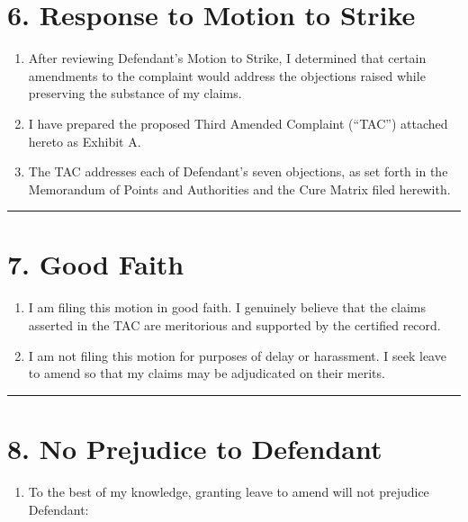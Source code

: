 \section{6. Response to Motion to Strike}\label{response-to-motion-to-strike}

\begin{enumerate}
\def\labelenumi{\arabic{enumi}.}
\setcounter{enumi}{12}
\item
  After reviewing Defendant's Motion to Strike, I determined that certain amendments to the complaint would address the objections raised while preserving the substance of my claims.
\item
  I have prepared the proposed Third Amended Complaint (``TAC'') attached hereto as Exhibit A.
\item
  The TAC addresses each of Defendant's seven objections, as set forth in the Memorandum of Points and Authorities and the Cure Matrix filed herewith.
\end{enumerate}

\begin{center}\rule{0.5\linewidth}{0.5pt}\end{center}

\section{7. Good Faith}\label{good-faith}

\begin{enumerate}
\def\labelenumi{\arabic{enumi}.}
\setcounter{enumi}{15}
\item
  I am filing this motion in good faith. I genuinely believe that the claims asserted in the TAC are meritorious and supported by the certified record.
\item
  I am not filing this motion for purposes of delay or harassment. I seek leave to amend so that my claims may be adjudicated on their merits.
\end{enumerate}

\begin{center}\rule{0.5\linewidth}{0.5pt}\end{center}

\section{8. No Prejudice to Defendant}\label{no-prejudice-to-defendant}

\begin{enumerate}
\def\labelenumi{\arabic{enumi}.}
\setcounter{enumi}{17}
\tightlist
\item
  To the best of my knowledge, granting leave to amend will not prejudice Defendant:
\end{enumerate}

